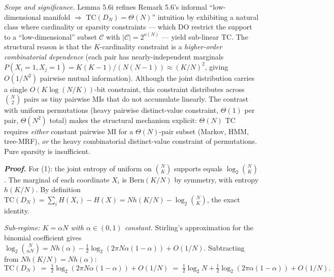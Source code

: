 \documentclass[
]{article}
\begin{document}
\emph{Scope and significance.} Lemma 5.6i refines Remark 5.6's
informal ``low-dimensional manifold $\Rightarrow$ $\mathrm{TC}(D_N) =
\Theta(N)$'' intuition by exhibiting a natural class where cardinality
or sparsity constraints --- which DO restrict the support to a
``low-dimensional'' subset $\mathcal{C}$ with $|\mathcal{C}| =
2^{o(N)}$ --- yield sub-linear $\mathrm{TC}$. The structural reason
is that the $K$-cardinality constraint is a \emph{higher-order
combinatorial dependence} (each pair has nearly-independent marginals
$P(X_i = 1, X_j = 1) = K(K{-}1)/(N(N{-}1)) \approx (K/N)^2$, giving
$O(1/N^2)$ pairwise mutual information). Although the joint
distribution carries a single $O(K \log(N/K))$-bit constraint, this
constraint distributes across $\binom{N}{2}$ pairs as tiny pairwise
MIs that do not accumulate linearly. The contrast with uniform
permutations (heavy pairwise distinct-value constraint, $\Theta(1)$
per pair, $\Theta(N^2)$ total) makes the structural mechanism
explicit: $\Theta(N)$ $\mathrm{TC}$ requires \emph{either} constant
pairwise MI for a $\Theta(N)$-pair subset (Markov, HMM, tree-MRF),
\emph{or} the heavy combinatorial distinct-value constraint of
permutations. Pure sparsity is insufficient.

\emph{\textbf{Proof.}} For (1): the joint entropy of uniform on
$\binom{N}{K}$ supports equals $\log_2 \binom{N}{K}$. The marginal of
each coordinate $X_i$ is $\mathrm{Bern}(K/N)$ by symmetry, with
entropy $h(K/N)$. By definition $\mathrm{TC}(D_N) = \sum_i H(X_i) -
H(X) = N h(K/N) - \log_2 \binom{N}{K}$, the exact identity.

\emph{Sub-regime: $K = \alpha N$ with $\alpha \in (0, 1)$ constant.}
Stirling's approximation for the binomial coefficient gives
$\log_2 \binom{N}{\alpha N} = N h(\alpha) - \tfrac{1}{2} \log_2(2 \pi
N \alpha(1-\alpha)) + O(1/N)$. Subtracting from $N h(K/N) = N h(\alpha)$:
\[
\mathrm{TC}(D_N) \;=\; \tfrac{1}{2} \log_2(2 \pi N \alpha (1-\alpha))
+ O(1/N) \;=\; \tfrac{1}{2} \log_2 N + \tfrac{1}{2} \log_2(2 \pi \alpha(1-\alpha))
+ O(1/N).
\]
\end{document}
